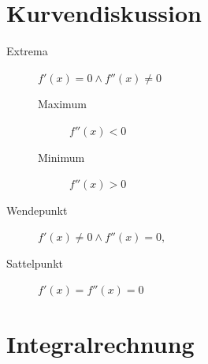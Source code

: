 \documentclass[a4paper]{scrartcl}
\begin{document}
                \section{Kurvendiskussion}
                \begin{description}
                    \item[Extrema] \(f'(x) = 0 \wedge f''(x) \neq 0\)
                    \begin{description}
                        \item[Maximum] \(f''(x) < 0\)
                        \item[Minimum]  \(f''(x) > 0\)
                    \end{description}
                    \item[Wendepunkt] \( f'(x) \neq 0 \wedge f''(x) = 0, \)
                    \item[Sattelpunkt] \(f'(x) = f''(x) = 0\) 
                \end{description}
                \section{Integralrechnung}
\end{document}
